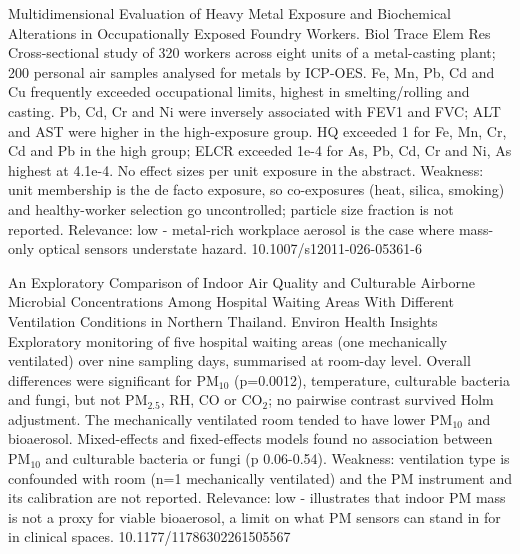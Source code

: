 \documentclass[10pt]{article}
\begin{document}
\par{}\baselineskip{}\baselineskip
{}

{Multidimensional Evaluation of Heavy Metal Exposure and Biochemical Alterations in Occupationally Exposed Foundry Workers.}
{Biol Trace Elem Res}
{Cross-sectional study of 320 workers across eight units of a metal-casting plant; 200 personal air samples analysed for metals by ICP-OES. Fe, Mn, Pb, Cd and Cu frequently exceeded occupational limits, highest in smelting/rolling and casting. Pb, Cd, Cr and Ni were inversely associated with FEV1 and FVC; ALT and AST were higher in the high-exposure group. HQ exceeded 1 for Fe, Mn, Cr, Cd and Pb in the high group; ELCR exceeded 1e-4 for As, Pb, Cd, Cr and Ni, As highest at 4.1e-4. No effect sizes per unit exposure in the abstract. Weakness: unit membership is the de facto exposure, so co-exposures (heat, silica, smoking) and healthy-worker selection go uncontrolled; particle size fraction is not reported. Relevance: low - metal-rich workplace aerosol is the case where mass-only optical sensors understate hazard.}
{10.1007/s12011-026-05361-6}

{An Exploratory Comparison of Indoor Air Quality and Culturable Airborne Microbial Concentrations Among Hospital Waiting Areas With Different Ventilation Conditions in Northern Thailand.}
{Environ Health Insights}
{Exploratory monitoring of five hospital waiting areas (one mechanically ventilated) over nine sampling days, summarised at room-day level. Overall differences were significant for PM$_{10}$ (p=0.0012), temperature, culturable bacteria and fungi, but not PM$_{2.5}$, RH, CO or CO$_2$; no pairwise contrast survived Holm adjustment. The mechanically ventilated room tended to have lower PM$_{10}$ and bioaerosol. Mixed-effects and fixed-effects models found no association between PM$_{10}$ and culturable bacteria or fungi (p 0.06-0.54). Weakness: ventilation type is confounded with room (n=1 mechanically ventilated) and the PM instrument and its calibration are not reported. Relevance: low - illustrates that indoor PM mass is not a proxy for viable bioaerosol, a limit on what PM sensors can stand in for in clinical spaces.}
{10.1177/11786302261505567}
\end{document}
